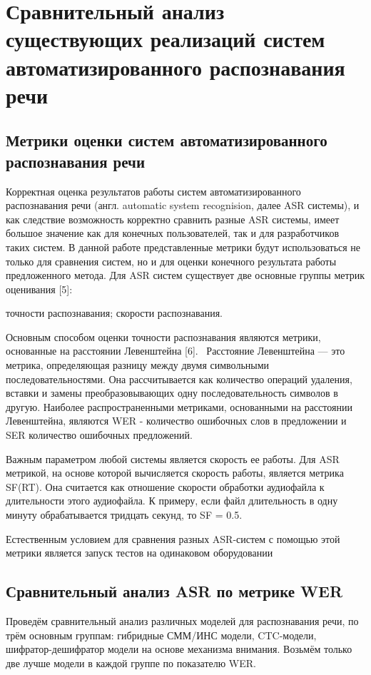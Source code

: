 \documentclass[conference]{IEEEtran}
\begin{document}
    \section{Сравнительный анализ существующих реализаций систем автоматизированного распознавания речи}

    \subsection{Метрики оценки систем автоматизированного распознавания речи}\label{WERSF}

    Корректная оценка результатов работы систем автоматизированного распознавания речи (англ. automatic system recognision, далее ASR системы),
    и как следствие возможность корректно сравнить разные ASR системы, имеет большое значение как для конечных пользователей,
    так и для разработчиков таких систем. В данной работе представленные метрики будут использоваться не только для сравнения систем,
    но и для оценки конечного результата работы предложенного метода.
    Для ASR систем существует две основные группы метрик оценивания [5]:
    \begin{itemize}
         точности распознавания;
         скорости распознавания.
    \end{itemize}

    Основным способом оценки точности распознавания являются метрики, основанные на расстоянии Левенштейна [6]. 
Расстояние Левенштейна — это метрика, определяющая разницу между двумя символьными последовательностями. Она рассчитывается как количество операций удаления, вставки и замены преобразовывающих одну последовательность символов в другую. Наиболее распространенными метриками, основанными на расстоянии Левенштейна, являются WER - количество ошибочных слов в предложении и SER количество ошибочных предложений.

Важным параметром любой системы является скорость ее работы. Для ASR метрикой, на основе которой вычисляется скорость работы, является метрика SF(RT). Она считается как отношение скорости обработки аудиофайла к длительности этого аудиофайла. К примеру, если файл длительность в одну минуту обрабатывается тридцать секунд, то SF = 0.5.

Естественным условием для сравнения разных ASR-систем с помощью этой метрики является запуск тестов на одинаковом оборудовании

\subsection{Сравнительный анализ ASR по метрике WER}\label{AA}
Проведём сравнительный анализ различных моделей для распознавания речи, по трём основным группам: гибридные СММ/ИНС модели, CTC-модели, шифратор-дешифратор модели на основе механизма внимания. Возьмём только две лучше модели в каждой группе по показателю WER.
\end{document}
